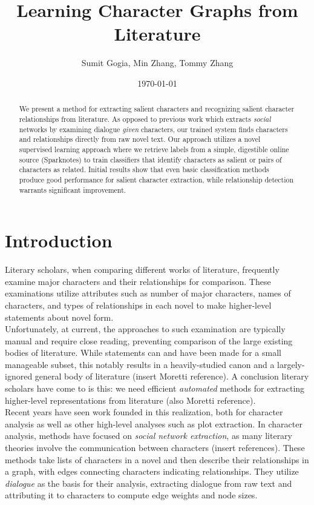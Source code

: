 \documentclass[12pt]{article}
\begin{document}
\title{Learning Character Graphs from Literature}
\author{Sumit Gogia, Min Zhang, Tommy Zhang}
\date{\today}

\maketitle

\begin{abstract}

We present a method for extracting salient characters and recognizing salient character relationships from literature. As opposed to previous work which extracts \emph{social} networks by examining dialogue \emph{given} characters, our trained system finds characters and relationships directly from raw novel text. Our approach utilizes a novel supervised learning approach where we retrieve labels from a simple, digestible online source (Sparknotes) to train classifiers that identify characters as salient or pairs of characters as related. Initial results show that even basic classification methods produce good performance for salient character extraction, while relationship detection warrants significant improvement. 

\end{abstract}

\section{Introduction}

Literary scholars, when comparing different works of literature, frequently examine major characters and their relationships for comparison. These examinations utilize attributes such as number of major characters, names of characters, and types of relationships in each novel to make higher-level statements about novel form. \\

Unfortunately, at current, the approaches to such examination are typically manual and require close reading, preventing comparison of the large existing bodies of literature. While statements can and have been made for a small manageable subset, this notably results in a heavily-studied canon and a largely-ignored general body of literature (insert Moretti reference). A conclusion literary scholars have come to is this: we need efficient \emph{automated} methods for extracting higher-level representations from literature (also Moretti reference). \\

Recent years have seen work founded in this realization, both for character analysis as well as other high-level analyses such as plot extraction. In character analysis, methods have focused on \emph{social network extraction}, as many literary theories involve the communication between characters (insert references). These methods take lists of characters in a novel and then describe their relationships in a graph, with edges connecting characters indicating relationships. They utilize \emph{dialogue} as the basis for their analysis, extracting dialogue from raw text and attributing it to characters to compute edge weights and node sizes. \\
\end{document}

